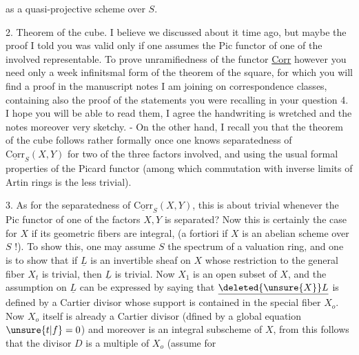 as a quasi-projective scheme over $S$.

2. Theorem of the cube. I believe we discussed about it time ago, but maybe the proof I told you was valid only if one assumes the Pic functor of one of the  involved representable. To prove unramifiedness of the functor \uline{Corr} however you need only a week infinitsmal form of the theorem of the square, for which you will find a proof in the manuscript notes I am joining on correspondence classes, containing also the proof of the statements you were recalling in your question 4. I hope you will be able to read them, I agree the handwriting is wretched and the notes moreover very sketchy. - On the other hand, I recall you that the theorem of the cube follows rather formally once one knows separatedness of $\underline{\mathrm{Corr}}_{S}(X,Y)$ for two of the three factors involved, and using the usual formal properties of the Picard functor (among which commutation with inverse limits of Artin rings is the less trivial).

3. As for the separatedness of $\underline{\mathrm{Corr}}_{S}(X,Y)$, this is about trivial whenever the Pic functor of one of the factors $X,Y$ is separated? Now this is certainly the case  for $X$ if its geometric fibers are integral, (a fortiori if $X$ is an abelian scheme over $S$ !). To show this, one may assume $S$ the spectrum of a  valuation ring, and one is  to show that if $\underline{L}$ is an invertible sheaf on $X$ whose restriction to the general fiber $X_{t}$ is trivial, then $\underline{L}$ is trivial. Now $X_{1}$ is an open subset of $X$, and the assumption on $\underline{L}$ can be expressed by saying that $\underline{\deleted{\unsure{X}}L}$ is defined by a Cartier divisor whose support is contained in the special fiber $X_{o}$. Now $X_{o}$ itself is already a Cartier divisor (dfined by a global equation $\unsure{t|f}=0$) and moreover is an integral subscheme of $X$, from this follows that the divisor $D$ is a multiple of $X_{o}$ (assume for
